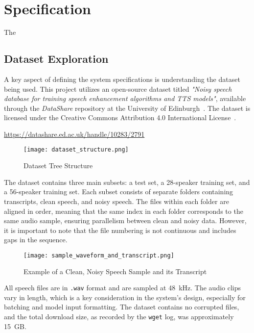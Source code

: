 \graphicspath{{content/chapters/4_specification/figures/}}
\chapter{Specification}
\label{chp:specification}

The 

\section{Dataset Exploration}
\label{sec:dataset_exploration}

A key aspect of defining the system specifications is understanding the dataset being used. This project utilizes an open-source dataset titled \textit{"Noisy speech database for training speech enhancement algorithms and TTS models"}, available through the \textit{DataShare} repository at the University of Edinburgh~\cite{edinburghdataset}. The dataset is licensed under the Creative Commons Attribution 4.0 International License~\cite{ccby4}.

\url{https://datashare.ed.ac.uk/handle/10283/2791}

\begin{figure}[H]
    \centering
    \texttt{[image: dataset\_structure.png]}
    \caption{Dataset Tree Structure}
    \label{fig:dataset_structure}
\end{figure}

The dataset contains three main subsets: a test set, a 28-speaker training set, and a 56-speaker training set. Each subset consists of separate folders containing transcripts, clean speech, and noisy speech. The files within each folder are aligned in order, meaning that the same index in each folder corresponds to the same audio sample, ensuring parallelism between clean and noisy data. However, it is important to note that the file numbering is not continuous and includes gaps in the sequence.

\begin{figure}[H]
    \centering
    \texttt{[image: sample\_waveform\_and\_transcript.png]}
    \caption{Example of a Clean, Noisy Speech Sample and its Transcript}
    \label{fig:sample_waveform_and_transcript}
\end{figure}

All speech files are in \texttt{.wav} format and are sampled at 48~kHz. The audio clips vary in length, which is a key consideration in the system's design, especially for batching and model input formatting. The dataset contains no corrupted files, and the total download size, as recorded by the \texttt{wget} log, was approximately 15~GB.

